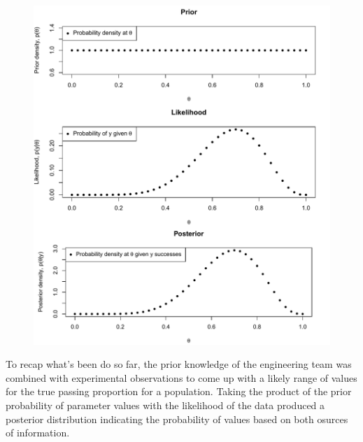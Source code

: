 \documentclass[11pt,a4paper,article]{memoir} %
\begin{document}
\begin{figure}
\includegraphics[width=\textwidth]{Bayesian_inference.pdf}
\caption{}
\label{fig:binom_bayes_inference}
\end{figure}

To recap what's been do so far, the prior knowledge of the engineering team was combined with experimental observations to come up with a likely range of values for the true passing proportion for a population. Taking the product of the prior probability of parameter values with the likelihood of the data produced a posterior distribution indicating the probability of values based on both osurces of information.
\end{document}
